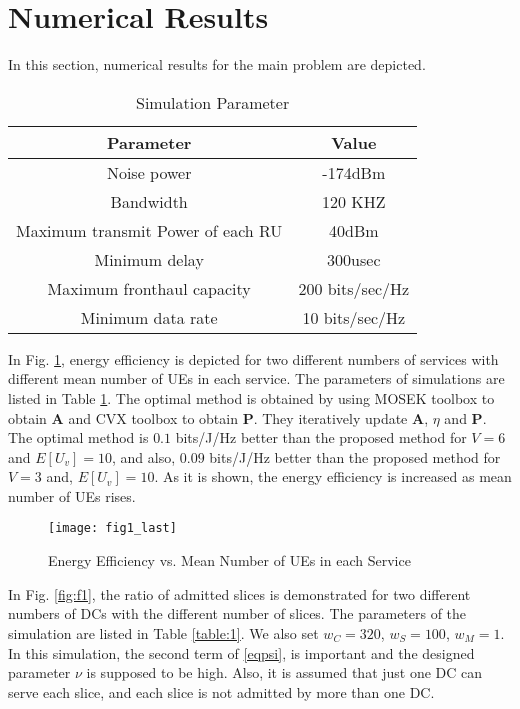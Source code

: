 \documentclass[conference]{IEEEtran}
\begin{document}
\section{Numerical Results}\label{simul}
In this section, numerical results for the main problem are depicted.
 \begin{table}
 \caption {Simulation Parameter} \label{table:1a}
 \begin{center}
  \begin{tabular}{||c c ||}
  \hline
Parameter & Value \\ [0.5ex]
  \hline\hline
  Noise power & -174dBm\\
  \hline
  Bandwidth & 120 KHZ \\
  \hline
 Maximum transmit Power of each RU & 40dBm \\
  \hline
  Minimum delay &  300usec \\
  \hline
  Maximum fronthaul capacity  & 200 bits/sec/Hz \\
   \hline
  Minimum data rate &  10 bits/sec/Hz \\ [1ex]
  \hline
 \end{tabular}
 \end{center}
 \end{table}
In Fig. \ref{fig:f1a}, energy efficiency is depicted for two different numbers of services with different mean number of UEs in each service. The parameters of simulations are listed in Table \ref{table:1a}. The optimal method is obtained by using MOSEK toolbox to obtain $\boldsymbol{A}$ and CVX toolbox to obtain $\boldsymbol{P}$. They iteratively update $\boldsymbol{A}$, $\eta$ and $\boldsymbol{P}$. The optimal method is $0.1$ bits/J/Hz better than the proposed method for $V = 6$ and $E[U_v] = 10$, and also, $0.09$ bits/J/Hz better than the proposed method for $V = 3$ and, $E[U_v] = 10$. As it is shown, the energy efficiency is increased as mean number of UEs rises.
\begin{figure}%
  \centering
    \texttt{[image: fig1\_last]}
  \caption{Energy Efficiency vs. Mean Number of UEs in each Service}
  \label{fig:f1a}
\end{figure}
In Fig. \ref{fig:f1}, the ratio of admitted slices is demonstrated for two different numbers of DCs with the different number of slices. The parameters of the simulation are listed in Table \ref{table:1}. We also set $w_C = 320$, $w_S = 100$, $w_M =1$. In this simulation, the second term of \eqref{eqpsi}, is important and the designed parameter $\nu$ is supposed to be high.
Also, it is assumed that just one DC can serve each slice, and each slice is not admitted by more than one DC. 
\end{document}
